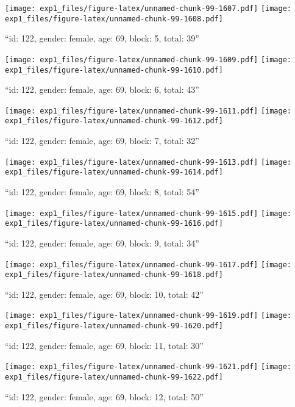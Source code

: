 \documentclass[,]{article}
\begin{document}
\texttt{[image: exp1\_files/figure-latex/unnamed-chunk-99-1607.pdf]}
\texttt{[image: exp1\_files/figure-latex/unnamed-chunk-99-1608.pdf]}

\newpage
[1] 

``id: 122, gender: female, age: 69, block: 5, total: 39''

\texttt{[image: exp1\_files/figure-latex/unnamed-chunk-99-1609.pdf]}
\texttt{[image: exp1\_files/figure-latex/unnamed-chunk-99-1610.pdf]}

\newpage
[1] 

``id: 122, gender: female, age: 69, block: 6, total: 43''

\texttt{[image: exp1\_files/figure-latex/unnamed-chunk-99-1611.pdf]}
\texttt{[image: exp1\_files/figure-latex/unnamed-chunk-99-1612.pdf]}

\newpage
[1] 

``id: 122, gender: female, age: 69, block: 7, total: 32''

\texttt{[image: exp1\_files/figure-latex/unnamed-chunk-99-1613.pdf]}
\texttt{[image: exp1\_files/figure-latex/unnamed-chunk-99-1614.pdf]}

\newpage
[1] 

``id: 122, gender: female, age: 69, block: 8, total: 54''

\texttt{[image: exp1\_files/figure-latex/unnamed-chunk-99-1615.pdf]}
\texttt{[image: exp1\_files/figure-latex/unnamed-chunk-99-1616.pdf]}

\newpage
[1] 

``id: 122, gender: female, age: 69, block: 9, total: 34''

\texttt{[image: exp1\_files/figure-latex/unnamed-chunk-99-1617.pdf]}
\texttt{[image: exp1\_files/figure-latex/unnamed-chunk-99-1618.pdf]}

\newpage
[1] 

``id: 122, gender: female, age: 69, block: 10, total: 42''

\texttt{[image: exp1\_files/figure-latex/unnamed-chunk-99-1619.pdf]}
\texttt{[image: exp1\_files/figure-latex/unnamed-chunk-99-1620.pdf]}

\newpage
[1] 

``id: 122, gender: female, age: 69, block: 11, total: 30''

\texttt{[image: exp1\_files/figure-latex/unnamed-chunk-99-1621.pdf]}
\texttt{[image: exp1\_files/figure-latex/unnamed-chunk-99-1622.pdf]}

\newpage
[1] 

``id: 122, gender: female, age: 69, block: 12, total: 50''
\end{document}
